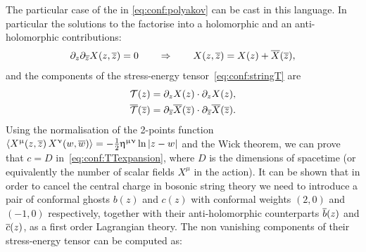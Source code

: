 The particular case of the \cft in \eqref{eq:conf:polyakov} can be cast in this language.
In particular the solutions to the \eom factorise into a holomorphic and an anti-holomorphic contributions:
\begin{equation}
  \partial_{z} \partial_{\overline{z}} X( z, \overline{z} ) = 0
  \qquad
  \Rightarrow
  \qquad
  X( z, \overline{z} ) = X( z ) + \overline{X}( \overline{z} ),
\end{equation}
and the components of the stress-energy tensor~\eqref{eq:conf:stringT} are
\begin{equation}
  \begin{split}
    \mathcal{T}( z ) & = \partial_{z} X( z ) \cdot \partial_{z} X( z ),
    \\
    \overline{\mathcal{T}}( \overline{z} ) & = \partial_{\overline{z}} \overline{X}( \overline{z} ) \cdot \partial_{\overline{z}} \overline{X}( \overline{z} ).
  \end{split}
  \label{eq:conf:bosonicstringT}
\end{equation}
Using the normalisation of the 2-points function $\left\langle X^{\upmu}( z, \overline{z} )\, X^{\upnu}( w, \overline{w} ) \right\rangle = - \frac{1}{2} \upeta^{\upmu\upnu} \ln\left| z - w \right|$ and the Wick theorem, we can prove that $c = D$ in~\eqref{eq:conf:TTexpansion}, where $D$ is the dimensions of spacetime (or equivalently the number of scalar fields $X^{\mu}$ in the action).
It can be shown that in order to cancel the central charge in bosonic string theory we need to introduce a pair of conformal ghosts $b(z)$ and $c(z)$ with conformal weights $(2, 0)$ and $(-1, 0)$ respectively, together with their anti-holomorphic counterparts $\overline{b}(z)$ and $\overline{c}(z)$, as a first order Lagrangian theory.
The non vanishing components of their stress-energy tensor can be computed as:\footnotemark{}
